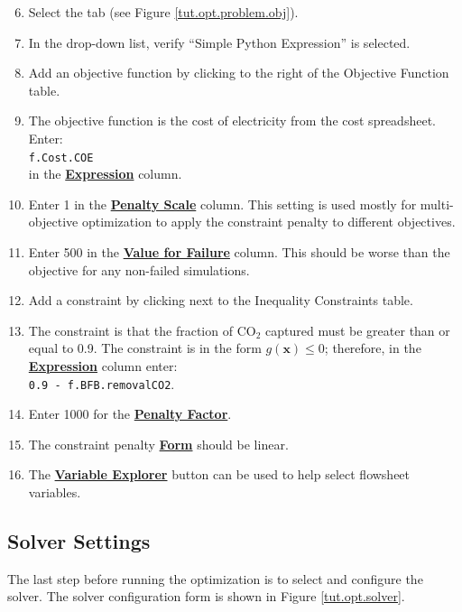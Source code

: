 \begin{enumerate}
	\setcounter{enumi}{5}
	\item Select the  tab (see Figure \ref{tut.opt.problem.obj}).
	\item In the drop-down list, verify ``Simple Python Expression'' is selected.
	\item Add an objective function by clicking \bu{+} to the right of the Objective Function table.
	\item The objective function is the cost of electricity from the cost spreadsheet.  Enter:\\
	   \verb|f.Cost.COE|\\
	    in the \textbf{\underline{Expression}} column.
	\item Enter 1 in the \textbf{\underline{Penalty Scale}} column. This setting is used mostly for multi-objective optimization to apply the constraint penalty to different objectives.
	\item Enter 500 in the \textbf{\underline{Value for Failure}} column. This should be worse than the objective for any non-failed simulations.
	\item Add a constraint by clicking \bu{+} next to the Inequality Constraints table.
	\item The constraint is that the fraction of CO$_2$ captured must be greater than or equal to 0.9. The constraint is in the form $g(\mathbf{x}) \leq 0$; therefore, in the \textbf{\underline{Expression}} column enter: \\
	 \verb|0.9 - f.BFB.removalCO2|.
	\item Enter 1000 for the \textbf{\underline{Penalty Factor}}.
	\item The constraint penalty \textbf{\underline{Form}} should be linear.
	\item The \textbf{\underline{Variable Explorer}} button can be used to help select flowsheet variables.
\end{enumerate}


\subsection{Solver Settings}
The last step before running the optimization is to select and configure the solver. The solver configuration form is shown in Figure \ref{tut.opt.solver}.

